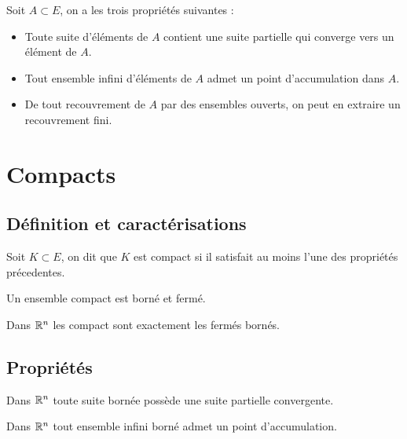 \begin{proposition}
    Soit $A \subset E$, on a les trois propriétés suivantes :
    \begin{itemize}
        \item Toute suite d'éléments de $A$ contient une suite partielle qui converge vers un élément de $A$. 
        \item Tout ensemble infini d'éléments de $A$ admet un point d'accumulation dans $A$. 
        \item De tout recouvrement de $A$ par des ensembles ouverts, on peut en extraire un recouvrement fini. 
    \end{itemize}
\end{proposition}



\section{Compacts}

\subsection{Définition et caractérisations}

\begin{definition}
    Soit $K \subset E$, on dit que $K$ est compact si il satisfait au moins l'une des propriétés précedentes. 
\end{definition}

\begin{proposition}
    Un ensemble compact est borné et fermé. 
\end{proposition}

\begin{corollary}
    Dans $\mathbb{R}^n$ les compact sont exactement les fermés bornés. 
\end{corollary}

\subsection{Propriétés}

\begin{corollary}
    Dans $\mathbb{R}^n$ toute suite bornée possède une suite partielle convergente. 
\end{corollary}

\begin{corollary}
    Dans $\mathbb{R}^n$ tout ensemble infini borné admet un point d'accumulation. 
\end{corollary}


